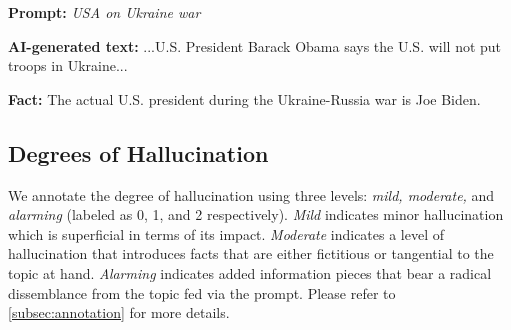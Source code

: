 \vspace{-4mm}
\begin{tcolorbox}[enhanced,attach boxed title to top right={yshift=-2.5mm,yshifttext=-1mm},
left=1pt,right=1pt,top=1pt,bottom=1pt, colback=blue!5!white,colframe=blue!75!black,colbacktitle=red!80!black,
  title=alarming,fonttitle=\ttfamily\bfseries\scshape\fontsize{9}{9.6}\selectfont,
  boxed title style={size=small,colframe=red!50!black} ]

  \vspace{-1.25mm}
  \begin{spacing}{0.75}
  \textbf{\scriptsize Prompt:} \textit{\scriptsize USA on Ukraine war}
  \end{spacing}

  \vspace{-2mm}
  \DrawLine

  \begin{spacing}{0.75}
  \textbf{\scriptsize AI-generated text:} 
  {\scriptsize\selectfont ...U.S. President Barack Obama says the U.S. will not put troops in Ukraine...}
  \end{spacing}

  \vspace{-2mm}
  \DrawLine

  \textbf{\scriptsize Fact:} \scriptsize The actual U.S. president during the Ukraine-Russia war is Joe Biden. 

\end{tcolorbox}


\subsection{Degrees of Hallucination}

We annotate the degree of hallucination using three levels: \textit{mild, moderate,} and \textit{alarming} (labeled as 0, 1, and 2 respectively). \textit{Mild} indicates minor hallucination which is superficial in terms of its impact. \textit{Moderate} indicates a level of hallucination that introduces facts that are either fictitious or tangential to the topic at hand. \textit{Alarming} indicates added information pieces that bear a radical dissemblance from the topic fed via the prompt. Please refer to \cref{subsec:annotation} for more details.


